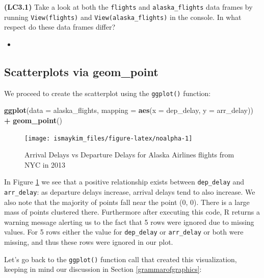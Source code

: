 \documentclass[12pt,]{krantz}
\makeatletter
\newenvironment{Shaded}{\begin{snugshade}}{\end{snugshade}}
\newcommand{\KeywordTok}[1]{\textcolor[rgb]{0.27,0.27,0.27}{\textbf{#1}}}
\newcommand{\DataTypeTok}[1]{\textcolor[rgb]{0.27,0.27,0.27}{#1}}
\newcommand{\StringTok}[1]{\textcolor[rgb]{0.5,0.5,0.5}{#1}}
\newcommand{\OperatorTok}[1]{\textcolor[rgb]{0.43,0.43,0.43}{\textbf{#1}}}
\newcommand{\NormalTok}[1]{#1}
\newenvironment{kframe}{%
\medskip{}
\setlength{\fboxsep}{.8em}
 \def\at@end@of@kframe{}%
 \ifinner\ifhmode%
  \def\at@end@of@kframe{\end{minipage}}%
  \begin{minipage}{\columnwidth}%
 \fi\fi%
 \def\FrameCommand##1{\hskip\@totalleftmargin \hskip-\fboxsep
 \colorbox{shadecolor}{##1}\hskip-\fboxsep
     \hskip-\linewidth \hskip-\@totalleftmargin \hskip\columnwidth}%
 \MakeFramed {\advance\hsize-\width
   \@totalleftmargin\z@ \linewidth\hsize
   \@setminipage}}%
 {\par\unskip\endMakeFramed%
 \at@end@of@kframe}
\renewenvironment{Shaded}{\begin{kframe}}{\end{kframe}}
\newenvironment{rmdblock}[1]
  {\begin{shaded*}
  \begin{itemize}
  \renewcommand{\labelitemi}{
    \raisebox{-.7\height}[0pt][0pt]{
    }
  }
  \item
  }
  {
  \end{itemize}
  \end{shaded*}
  }
\newenvironment{learncheck}
  {\begin{rmdblock}{warning}}
  {\end{rmdblock}}
\makeatother
\begin{document}
\textbf{(LC3.1)} Take a look at both the \texttt{flights} and
\texttt{alaska\_flights} data frames by running \texttt{View(flights)}
and \texttt{View(alaska\_flights)} in the console. In what respect do
these data frames differ?

\begin{learncheck}

\end{learncheck}

\subsection{Scatterplots via geom\_point}\label{geompoint}

We proceed to create the scatterplot using the \texttt{ggplot()}
function:

\begin{Shaded}
\begin{Highlighting}[]
\KeywordTok{ggplot}\NormalTok{(}\DataTypeTok{data =}\NormalTok{ alaska_flights, }
       \DataTypeTok{mapping =} \KeywordTok{aes}\NormalTok{(}\DataTypeTok{x =}\NormalTok{ dep_delay, }\DataTypeTok{y =}\NormalTok{ arr_delay)) }\OperatorTok{+}\StringTok{ }
\StringTok{  }\KeywordTok{geom_point}\NormalTok{()}
\end{Highlighting}
\end{Shaded}

\begin{figure}

{\centering \texttt{[image: ismaykim\_files/figure-latex/noalpha-1]} 

}

\caption{Arrival Delays vs Departure Delays for Alaska Airlines flights from NYC in 2013}\label{fig:noalpha}
\end{figure}

In Figure \ref{fig:noalpha} we see that a positive relationship exists
between \texttt{dep\_delay} and \texttt{arr\_delay}: as departure delays
increase, arrival delays tend to also increase. We also note that the
majority of points fall near the point (0, 0). There is a large mass of
points clustered there. Furthermore after executing this code, R returns
a warning message alerting us to the fact that 5 rows were ignored due
to missing values. For 5 rows either the value for \texttt{dep\_delay}
or \texttt{arr\_delay} or both were missing, and thus these rows were
ignored in our plot.

Let's go back to the \texttt{ggplot()} function call that created this
visualization, keeping in mind our discussion in Section
\ref{grammarofgraphics}:
\end{document}
